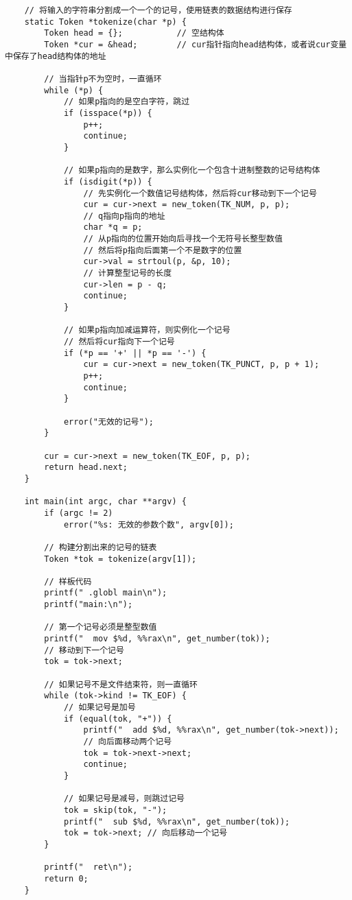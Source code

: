 \documentclass[cn,10pt,math=newtx,citestyle=gb7714-2015,bibstyle=gb7714-2015]{elegantbook}
\begin{document}
\begin{verbatim}
    // 将输入的字符串分割成一个一个的记号，使用链表的数据结构进行保存
    static Token *tokenize(char *p) {
        Token head = {};           // 空结构体
        Token *cur = &head;        // cur指针指向head结构体，或者说cur变量中保存了head结构体的地址

        // 当指针p不为空时，一直循环
        while (*p) {
            // 如果p指向的是空白字符，跳过
            if (isspace(*p)) {
                p++;
                continue;
            }

            // 如果p指向的是数字，那么实例化一个包含十进制整数的记号结构体
            if (isdigit(*p)) {
                // 先实例化一个数值记号结构体，然后将cur移动到下一个记号
                cur = cur->next = new_token(TK_NUM, p, p);
                // q指向p指向的地址
                char *q = p;
                // 从p指向的位置开始向后寻找一个无符号长整型数值
                // 然后将p指向后面第一个不是数字的位置
                cur->val = strtoul(p, &p, 10);
                // 计算整型记号的长度
                cur->len = p - q;
                continue;
            }

            // 如果p指向加减运算符，则实例化一个记号
            // 然后将cur指向下一个记号
            if (*p == '+' || *p == '-') {
                cur = cur->next = new_token(TK_PUNCT, p, p + 1);
                p++;
                continue;
            }

            error("无效的记号");
        }

        cur = cur->next = new_token(TK_EOF, p, p);
        return head.next;
    }

    int main(int argc, char **argv) {
        if (argc != 2)
            error("%s: 无效的参数个数", argv[0]);

        // 构建分割出来的记号的链表
        Token *tok = tokenize(argv[1]);

        // 样板代码
        printf(" .globl main\n");
        printf("main:\n");

        // 第一个记号必须是整型数值
        printf("  mov $%d, %%rax\n", get_number(tok));
        // 移动到下一个记号
        tok = tok->next;

        // 如果记号不是文件结束符，则一直循环
        while (tok->kind != TK_EOF) {
            // 如果记号是加号
            if (equal(tok, "+")) {
                printf("  add $%d, %%rax\n", get_number(tok->next));
                // 向后面移动两个记号
                tok = tok->next->next;
                continue;
            }

            // 如果记号是减号，则跳过记号
            tok = skip(tok, "-");
            printf("  sub $%d, %%rax\n", get_number(tok));
            tok = tok->next; // 向后移动一个记号
        }

        printf("  ret\n");
        return 0;
    }
\end{verbatim}
\end{document}
